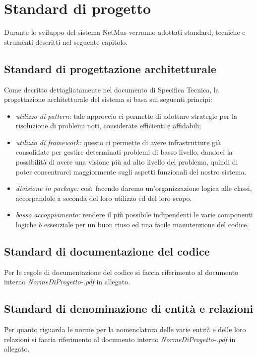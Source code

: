 \chapter{Standard di progetto}
\thispagestyle{fancy} %
Durante lo sviluppo del sistema NetMus verranno adottati standard,
tecniche e strumenti descritti nel seguente capitolo.

\section{Standard di progettazione architetturale}
Come decritto dettagliatamente nel documento di Specifica Tecnica, la
progettazione architetturale del sistema si basa sui seguenti principi:

\begin{itemize}
  \item \emph{utilizzo di pattern:} tale approccio ci permette di adottare
  strategie per la risoluzione di problemi noti, considerate efficienti e affidabili;
  \item \emph{utilizzo di framework:} questo ci permette di avere infrastrutture
  gi\`a consolidate per gestire determinati problemi di basso livello, dandoci
  la possibilit\`a di avere una visione pi\`u ad alto livello del problema,
  quindi di poter concentrarci maggiormente sugli aspetti funzionali del nostro
  sistema.
  \item \emph{divisione in package:} cos\`\i\ facendo daremo un'organizzazione
  logica alle classi, accorpandole a seconda del loro utilizzo ed del loro
  scopo.
  \item \emph{basso accoppiamento:} rendere il pi\`u possibile indipendenti le
  varie componenti logiche \`e essenziale per un buon riuso ed una facile
  manutenzione del codice.
\end{itemize}

\section{Standard di documentazione del codice}
Per le regole di documentazione del codice si faccia riferimento al documento
interno \emph{NormeDiProgetto-\versionenormeprogetto.pdf} in allegato.

\section{Standard di denominazione di entit\`a e relazioni}
Per quanto riguarda le norme per la nomenclatura delle varie entit\`a e delle
loro relazioni si faccia riferimento al documento interno
\emph{NormeDiProgetto-\versionenormeprogetto.pdf} in allegato.

